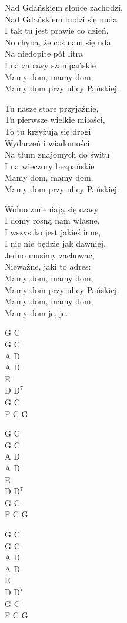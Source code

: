 \begin{text}
    Nad Gdańskiem słońce zachodzi,\\
    Nad Gdańskiem budzi się nuda\\
    I tak tu jest prawie co dzień,\\
    No chyba, że coś nam się uda.\\
    Na niedopite pół litra\\
    I na zabawy szampańskie\\
    \vin Mamy dom, mamy dom,\\
    \vin Mamy dom przy ulicy Pańskiej.

    Tu nasze stare przyjaźnie,\\
    Tu pierwsze wielkie miłości,\\
    To tu krzyżują się drogi\\
    Wydarzeń i wiadomości.\\
    Na tłum znajomych do świtu\\
    I na wieczory bezpańskie\\
    \vin Mamy dom, mamy dom,\\
    \vin Mamy dom przy ulicy Pańskiej.

    Wolno zmieniają się czasy\\
    I domy rosną nam własne,\\
    I wszystko jest jakieś inne,\\
    I nic nie będzie jak dawniej.\\
    Jedno musimy zachować,\\
    Nieważne, jaki to adres:\\
    \vin Mamy dom, mamy dom,\\
    \vin Mamy dom przy ulicy Pańskiej.\\
    \vin Mamy dom, mamy dom,\\
    \vin Mamy dom je, je.
\end{text}
\begin{chord}
    G C\\
    G C\\
    A D\\
    A D\\
    E\\
    D $\mathrm{D^7}$\\
    G C\\
    F C G

    G C\\
    G C\\
    A D\\
    A D\\
    E\\
    D $\mathrm{D^7}$\\
    G C\\
    F C G

    G C\\
    G C\\
    A D\\
    A D\\
    E\\
    D $\mathrm{D^7}$\\
    G C\\
    F C G
\end{chord}

